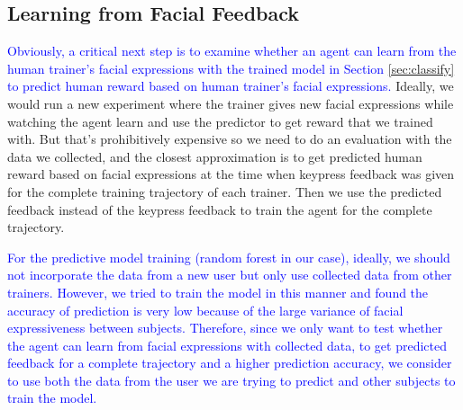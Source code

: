 \subsection{Learning from Facial Feedback}

\textcolor{blue}{Obviously, a critical next step is to examine whether an agent can learn from the human trainer's facial expressions with the trained model in Section \ref{sec:classify} to predict human reward based on human trainer's facial expressions. }%
Ideally, we would run a new experiment where the trainer gives new facial expressions while watching the agent learn and use the predictor to get reward that we trained with. But that's prohibitively expensive so we need to do an evaluation with the data we collected, and the closest approximation is to get predicted human reward based on facial expressions at the time when keypress feedback was given for the complete training trajectory of each trainer. Then we use the predicted feedback instead of the keypress feedback to train the agent for the complete trajectory. %

\textcolor{blue}{%
For the predictive model training (random forest in our case), ideally, we should not incorporate the data from a new user but only use collected data from other trainers. However, we tried to train the model in this manner and found the accuracy of prediction is very low because of the large variance of facial expressiveness between subjects. 
Therefore, since we only want to test whether the agent can learn from facial expressions with collected data, to get predicted feedback for a complete trajectory and a higher prediction accuracy, we consider to use both the data from the user we are trying to predict and other subjects to train the model.} 


